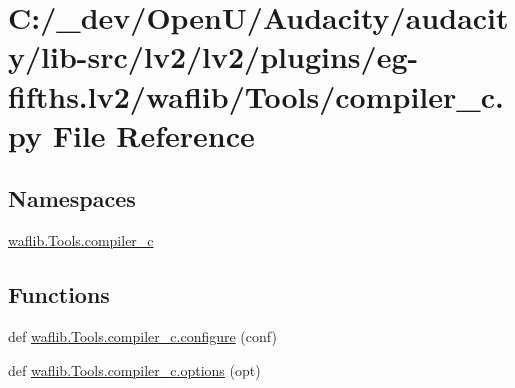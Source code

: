 \hypertarget{lv2_2plugins_2eg-fifths_8lv2_2waflib_2_tools_2compiler__c_8py}{}\section{C\+:/\+\_\+dev/\+Open\+U/\+Audacity/audacity/lib-\/src/lv2/lv2/plugins/eg-\/fifths.lv2/waflib/\+Tools/compiler\+\_\+c.py File Reference}
\label{lv2_2plugins_2eg-fifths_8lv2_2waflib_2_tools_2compiler__c_8py}
\subsection*{Namespaces}
\begin{DoxyCompactItemize}
\item 
 \hyperlink{namespacewaflib_1_1_tools_1_1compiler__c}{waflib.\+Tools.\+compiler\+\_\+c}
\end{DoxyCompactItemize}
\subsection*{Functions}
\begin{DoxyCompactItemize}
\item 
def \hyperlink{namespacewaflib_1_1_tools_1_1compiler__c_a21492d9277532807d6c9af80d07ab9cd}{waflib.\+Tools.\+compiler\+\_\+c.\+configure} (conf)
\item 
def \hyperlink{namespacewaflib_1_1_tools_1_1compiler__c_a3700f55375e0ba3c634ddfe42b019667}{waflib.\+Tools.\+compiler\+\_\+c.\+options} (opt)
\end{DoxyCompactItemize}
